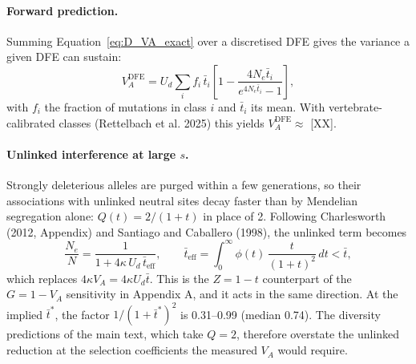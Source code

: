 \documentclass[12pt]{article}
\begin{document}
\paragraph{Forward prediction.} Summing Equation~\eqref{eq:D_VA_exact} over a discretised DFE gives the variance a given DFE can sustain:
\begin{equation}
    V_A^{\text{DFE}} = U_d \sum_i f_i\, \bar{t}_i\left[1 - \frac{4N_e\bar{t}_i}{e^{4N_e\bar{t}_i}-1}\right],
\label{eq:VA_forward}
\end{equation}
with $f_i$ the fraction of mutations in class $i$ and $\bar{t}_i$ its mean. With vertebrate-calibrated classes (Rettelbach et al. 2025) this yields $V_A^{\text{DFE}} \approx$ [XX].

\paragraph{Unlinked interference at large $s$.} Strongly deleterious alleles are purged within a few generations, so their associations with unlinked neutral sites decay faster than by Mendelian segregation alone: $Q(t) = 2/(1+t)$ in place of 2. Following Charlesworth (2012, Appendix) and Santiago and Caballero (1998), the unlinked term becomes
\begin{equation}
    \frac{N_e}{N} = \frac{1}{1 + 4\kappa\,U_d\,\bar{t}_\text{eff}}, \qquad \bar{t}_\text{eff} = \int_0^\infty \phi(t)\,\frac{t}{(1+t)^2}\,dt < \bar{t},
\label{eq:B_corrected}
\end{equation}
which replaces $4\kappa V_A = 4\kappa U_d\bar{t}$. This is the $Z = 1 - t$ counterpart of the $G = 1 - V_A$ sensitivity in Appendix A, and it acts in the same direction. At the implied $\bar{t}^*$, the factor $1/(1+\bar{t}^*)^2$ is 0.31--0.99 (median 0.74). The diversity predictions of the main text, which take $Q = 2$, therefore overstate the unlinked reduction at the selection coefficients the measured $V_A$ would require.
\end{document}

